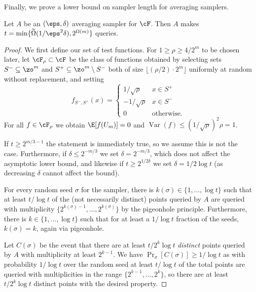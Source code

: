 Finally, we prove a lower bound on sampler length for averaging samplers. %
\begin{proposition}
Let $A$ be an $(\eps,\delta)$ averaging sampler for $\cF$. Then $A$ makes $t=\min\{\widetilde{\Omega}(1/\eps^2\delta),2^{\Omega(m)}\}$ queries.
\end{proposition}
\begin{proof}
We first define our set of test functions. For $1\geq \rho\geq 4/2^{m}$ to be chosen later, let $\cF_\rho\subset \cF$ be the class of functions obtained by selecting sets $S^-\subseteq \zo^m$ and $S^+\subseteq \zo^m\setminus S^-$ both of size $\lfloor (\rho/2)\cdot 2^m\rfloor$ uniformly at random without replacement, and setting
\[f_{S^-,S^+}(x) = \begin{cases}
1/\sqrt{\rho} & x\in S^+\\
-1/\sqrt{\rho} & x \in S^-\\
0 & \text{otherwise.}\end{cases}\]
For all $f\in \cF_\rho$ we obtain $\E[f(U_m)]=0$ and $\operatorname{Var}(f) \leq  (1/\sqrt{\rho})^2\rho=1$.


If $t\geq 2^{m/3-1}$ the statement is immediately true, so we assume this is not the case. Furthermore, if $\delta \leq 2^{-m/3}$ we set $\delta=2^{-m/3}$, which does not affect the asymptotic lower bound, and likewise if $t\geq 2^{1/2\delta}$ we set $\delta=1/2\log t$ (as decreasing $\delta$ cannot affect the bound).

For every random seed $\sigma$ for the sampler, there is $k(\sigma)\in \{1,\ldots,\log t\}$ such that at least $t/\log t$ of the (not necessarily distinct) points queried by $A$ are queried with multiplicity $\{2^{k(\sigma)-1},\ldots,2^{k(\sigma)}\}$ by the pigeonhole principle. Furthermore, there is $k\in \{1,\ldots,\log t\}$ such that for at least a $1/\log t$ fraction of the seeds, $k(\sigma)=k$, again via pigeonhole. 

Let $C(\sigma)$ be the event that there are at least $t/2^k\log t$ \textit{distinct} points queried by $A$ with multiplicity at least $2^{k-1}$. We have $\Pr_\sigma[C(\sigma)]\geq 1/\log t$ as with probability $1/\log t$ over the random seed at least $t/\log t$ of the total points are queried with multiplicities in the range $\{2^{k-1},\ldots,2^k\}$, so there are at least $t/2^{k}\log t$ distinct points with the desired property.


\end{proof}
